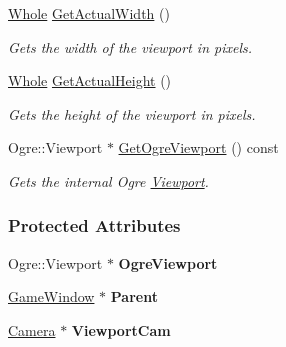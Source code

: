 \begin{DoxyCompactItemize}
\hyperlink{namespacephys_a460f6bc24c8dd347b05e0366ae34f34a}{Whole} \hyperlink{classphys_1_1Viewport_a301262e5da6926296241f0e2cc2de7d2}{GetActualWidth} ()
\begin{DoxyCompactList}\small\item\em Gets the width of the viewport in pixels. \item\end{DoxyCompactList}\item 
\hyperlink{namespacephys_a460f6bc24c8dd347b05e0366ae34f34a}{Whole} \hyperlink{classphys_1_1Viewport_a1eee22594548a38910dee8e838e6449d}{GetActualHeight} ()
\begin{DoxyCompactList}\small\item\em Gets the height of the viewport in pixels. \item\end{DoxyCompactList}\item 
Ogre::Viewport $\ast$ \hyperlink{classphys_1_1Viewport_a005b39a37464c4f4a365c2bdb08ffb04}{GetOgreViewport} () const 
\begin{DoxyCompactList}\small\item\em Gets the internal Ogre \hyperlink{classphys_1_1Viewport}{Viewport}. \item\end{DoxyCompactList}\end{DoxyCompactItemize}
\subsubsection*{Protected Attributes}
\begin{DoxyCompactItemize}
\item 
\hypertarget{classphys_1_1Viewport_a5251d485654d73414b9efdbb73015c83}{
Ogre::Viewport $\ast$ {\bfseries OgreViewport}}
\label{classphys_1_1Viewport_a5251d485654d73414b9efdbb73015c83}

\item 
\hypertarget{classphys_1_1Viewport_a833d36e97945498b2a4766c47c756e2f}{
\hyperlink{classphys_1_1GameWindow}{GameWindow} $\ast$ {\bfseries Parent}}
\label{classphys_1_1Viewport_a833d36e97945498b2a4766c47c756e2f}

\item 
\hypertarget{classphys_1_1Viewport_a3eb772321faeee0f76a80329ddc61885}{
\hyperlink{classphys_1_1Camera}{Camera} $\ast$ {\bfseries ViewportCam}}
\label{classphys_1_1Viewport_a3eb772321faeee0f76a80329ddc61885}

\end{DoxyCompactItemize}


